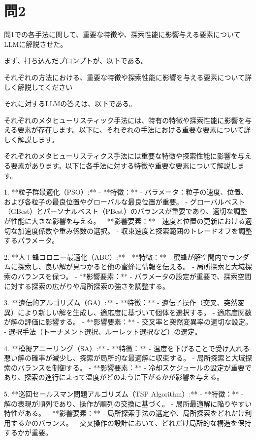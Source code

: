\documentclass[11pt, twocolumn]{ltjsarticle}
\begin{document}
\section{問2}
問1での各手法に関して、重要な特徴や、探索性能に影響与える要素についてLLMに解説させた。

まず、打ち込んだプロンプトが、以下である。

それぞれの方法における、重要な特徴や探索性能に影響を与える要素について詳しく解説してください

それに対するLLMの答えは、以下である。

それぞれのメタヒューリスティック手法には、特有の特徴や探索性能に影響を与える要素が存在します。以下に、それぞれの手法における重要な要素について詳しく解説します。

それぞれのメタヒューリスティクス手法には重要な特徴や探索性能に影響を与える要素があります。以下に各手法に対する特徴や重要な要素について解説します。

1. **粒子群最適化（PSO）:**
   - **特徴：**
     - パラメータ：粒子の速度、位置、および各粒子の最良位置やグローバルな最良位置が重要。
     - グローバルベスト（GBest）とパーソナルベスト（PBest）のバランスが重要であり、適切な調整が性能に大きな影響を与える。
   - **影響要素：**
     - 速度と位置の更新における適切な加速度係数や重み係数の選択。
     - 収束速度と探索範囲のトレードオフを調整するパラメータ。

2. **人工蜂コロニー最適化（ABC）:**
   - **特徴：**
     - 蜜蜂が解空間内でランダムに探索し、良い解が見つかると他の蜜蜂に情報を伝える。
     - 局所探索と大域探索のバランスを保つ。
   - **影響要素：**
     - パラメータの設定が重要で、探索空間に対する探索の広がりや局所探索の強さを調整する。

3. **遺伝的アルゴリズム（GA）:**
   - **特徴：**
     - 遺伝子操作（交叉、突然変異）により新しい解を生成し、適応度に基づいて個体を選択する。
     - 適応度関数が解の評価に影響する。
   - **影響要素：**
     - 交叉率と突然変異率の適切な設定。
     - 選択手法（トーナメント選択、ルーレット選択など）の選定。

4. **模擬アニーリング（SA）:**
   - **特徴：**
     - 温度を下げることで受け入れる悪い解の確率が減少し、探索が局所的な最適解に収束する。
     - 局所探索と大域探索のバランスを制御する。
   - **影響要素：**
     - 冷却スケジュールの設定が重要であり、探索の進行によって温度がどのように下がるかが影響を与える。

5. **巡回セールスマン問題アルゴリズム（TSP Algorithm）:**
   - **特徴：**
     - 解の表現が順列であり、操作が順列の交換に基づく。
     - 局所最適解に陥りやすい特性がある。
   - **影響要素：**
     - 局所探索手法の選定や、局所探索をどれだけ利用するかのバランス。
     - 交叉操作の設計において、どれだけ局所的な構造を保持するかが重要。
\end{document}

